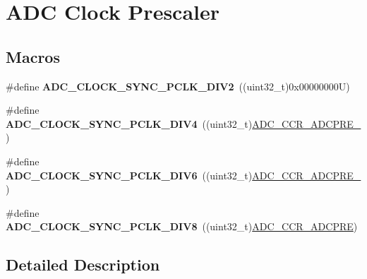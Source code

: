 \hypertarget{group___a_d_c___clock_prescaler}{}\section{A\+DC Clock Prescaler}
\label{group___a_d_c___clock_prescaler}
\subsection*{Macros}
\begin{DoxyCompactItemize}
\item 
\mbox{\label{group___a_d_c___clock_prescaler_ga71571b183aa6d0ddbaeef8a1da11d00a}} 
\#define {\bfseries A\+D\+C\+\_\+\+C\+L\+O\+C\+K\+\_\+\+S\+Y\+N\+C\+\_\+\+P\+C\+L\+K\+\_\+\+D\+I\+V2}~((uint32\+\_\+t)0x00000000\+U)
\item 
\mbox{\label{group___a_d_c___clock_prescaler_ga41b6a6d1cdf7806ec1e5790fc7fdc651}} 
\#define {\bfseries A\+D\+C\+\_\+\+C\+L\+O\+C\+K\+\_\+\+S\+Y\+N\+C\+\_\+\+P\+C\+L\+K\+\_\+\+D\+I\+V4}~((uint32\+\_\+t)\mbox{\hyperlink{group___peripheral___registers___bits___definition_gaf3108cc8fb81f6efd1e93fa5f82ac313}{A\+D\+C\+\_\+\+C\+C\+R\+\_\+\+A\+D\+C\+P\+R\+E\+\_}})
\item 
\mbox{\label{group___a_d_c___clock_prescaler_ga0da8cf05586963080a721928cae18913}} 
\#define {\bfseries A\+D\+C\+\_\+\+C\+L\+O\+C\+K\+\_\+\+S\+Y\+N\+C\+\_\+\+P\+C\+L\+K\+\_\+\+D\+I\+V6}~((uint32\+\_\+t)\mbox{\hyperlink{group___peripheral___registers___bits___definition_gafa090830d2d359db04f365d46c6644d5}{A\+D\+C\+\_\+\+C\+C\+R\+\_\+\+A\+D\+C\+P\+R\+E\+\_}})
\item 
\mbox{\label{group___a_d_c___clock_prescaler_gadc0676c90087e9cd3acc3ee1256f3cd0}} 
\#define {\bfseries A\+D\+C\+\_\+\+C\+L\+O\+C\+K\+\_\+\+S\+Y\+N\+C\+\_\+\+P\+C\+L\+K\+\_\+\+D\+I\+V8}~((uint32\+\_\+t)\mbox{\hyperlink{group___peripheral___registers___bits___definition_ga3a2ee019aef4c64fffc72141f7aaab2c}{A\+D\+C\+\_\+\+C\+C\+R\+\_\+\+A\+D\+C\+P\+RE}})
\end{DoxyCompactItemize}


\subsection{Detailed Description}
